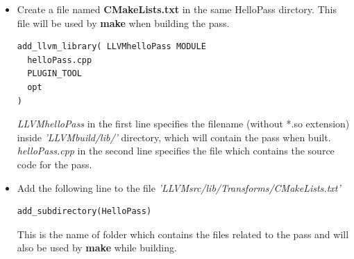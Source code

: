 \begin{itemize}
\begin{lstlisting}
    bool runOnFunction(Function &F) override {
      errs() << "Function Name: ";
      errs().write_escaped(F.getName()) << '\n';
      errs() << "===================================================\n";
      for(auto bb = F.begin(); bb != F.end(); bb++){
        errs() << "\tBasicBlock Name = " << bb->getName() << "\n";
        errs() << "\tBasicBlock Size = " << bb->size() << "\n";
        for(auto i = bb->begin(); i != bb->end(); i++){
          errs() << "\t" << "Instruction: " << *i << "\n";
          errs() << "\t" << "OpCode: " << i->getOpcode() << "\n";
          errs() << "\t" << "OpCodeName: " << i->getOpcodeName() << "\n";
          errs() << "\t" << "IsBinaryOp: " << i->isBinaryOp() << "\n";
          errs() << "\t" << "IsCommutative: " << i->isCommutative() << "\n";
          errs() << "\t" << "IsAssociative: " << i->isAssociative() << "\n";
        }
        errs() << "\n\n";
      } 
      return false;
    }
  };
}
char itrinstBB::ID = 0;
static RegisterPass<helloPass> X("hello", 
                                 "Iterates instructions in a function");
        \end{lstlisting}
    The above code contains a \textbf{function pass} - which means the 
    pass is run on every function defined in a file. Using 
    iterators it traverses each basic block of the function, and 
    for each basic block, it traverses each instruction and 
    prints the details of the instruction - like its opcode, 
    whether it is commutative and associative etc.\\
    \textbf{Important} - Notice the first argument \textbf{hello} 
    which is passed in the last line while registering the pass. 
    This argument will be passed as a flag to the 
    \textbf{HelloPass} pass when the function-pass defined inside 
    \textbf{helloPass} structure (the template arguments in the last line)
    is to be executed.
    \item Create a file named \textbf{CMakeLists.txt} in the same 
    HelloPass dirctory. This file will be used by \textbf{make} when 
    building the pass.
        \begin{lstlisting}
add_llvm_library( LLVMhelloPass MODULE
  helloPass.cpp
  PLUGIN_TOOL
  opt
)
        \end{lstlisting}
        \textit{LLVMhelloPass} in the first line specifies the 
        filename (without *.so extension) inside \textit{'LLVMbuild/lib/'}
        directory, which will contain the pass when built. 
        \textit{helloPass.cpp} in the second line specifies the file 
        which contains the source code for the pass.
    \item Add the following line to the file 
    \textit{'LLVMsrc/lib/Transforms/CMakeLists.txt'}
        \begin{lstlisting}
add_subdirectory(HelloPass)
        \end{lstlisting}
    This is the name of folder which contains the files related to the pass 
    and will also be used by \textbf{make} while building.

\end{itemize}

